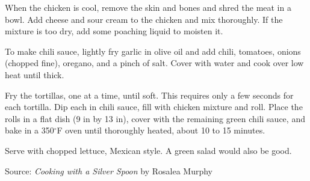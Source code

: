\documentclass[letterpaper]{recipePMG}
\renewcommand{\deg}{$^\circ$}
\begin{document}
When the chicken is cool, remove the skin and bones and shred the meat in a bowl. Add cheese and sour cream to the chicken and mix thoroughly. If the mixture is too dry, add some poaching liquid to moisten it.

To make chili sauce, lightly fry garlic in olive oil and add chili, tomatoes, onions (chopped fine), oregano, and a pinch of salt. Cover with water and cook over low heat until thick.


Fry the tortillas, one at a time, until soft. This requires only a few seconds for each tortilla. Dip each in chili sauce, fill with chicken mixture and roll. Place the rolls in a flat dish (9 in by 13 in), cover with the remaining green chili sauce, and bake in a 350\deg F oven until thoroughly heated, about 10 to 15 minutes.

Serve with chopped lettuce, Mexican style.  A green salad would also be good.

Source: \textit{Cooking with a Silver Spoon} by Rosalea Murphy
\end{document}
